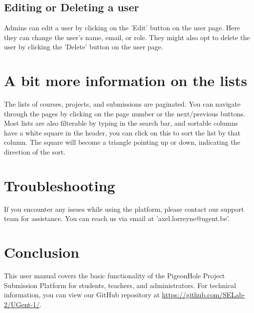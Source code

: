 \documentclass{article}
\begin{document}
\subsection{Editing or Deleting a user}
Admins can edit a user by clicking on the 'Edit' button on the user page. Here they can change the user's name, email, or role. They might also opt to delete the user by clicking the 'Delete' button on the user page.

\section{A bit more information on the lists}
The lists of courses, projects, and submissions are paginated. You can navigate through the pages by clicking on the page number or the next/previous buttons.
Most lists are also filterable by typing in the search bar, and sortable columns have a white square in the header, you can click on this to sort the list by that column.
The square will become a triangle pointing up or down, indicating the direction of the sort.

\section{Troubleshooting}
If you encounter any issues while using the platform, please contact our support team for assistance. You can reach us via email at 'axel.lorreyne@ugent.be'.

\section{Conclusion}
This user manual covers the basic functionality of the PigeonHole Project Submission Platform for students, teachers, and administrators. For technical information, you can view our GitHub repository at \url{https://github.com/SELab-2/UGent-1/}.
\end{document}
